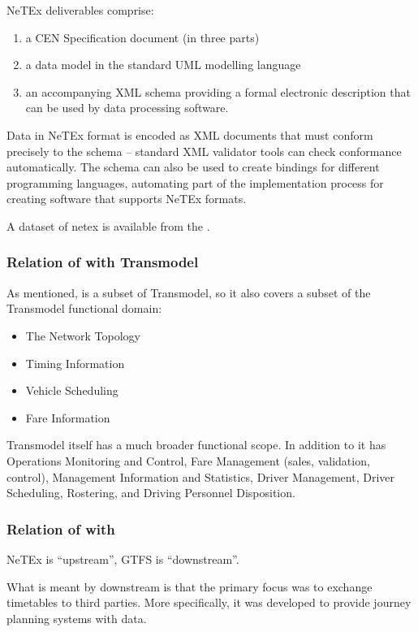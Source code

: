 NeTEx deliverables comprise: \begin{enumerate}
    \item a CEN Specification document (in three parts)
    \item a data model in the standard UML modelling language
    \item an accompanying XML schema providing a formal electronic description that can be used by data processing software.
\end{enumerate}

Data in NeTEx format is encoded as XML documents that must conform precisely to the schema – standard XML validator tools can check conformance automatically. The schema can also be used to create bindings for different
programming languages, automating part of the implementation process for creating software that supports NeTEx
formats. 

A dataset of netex is available from the  \cite{noauthor_use_nodate}. 

\subsubsection{Relation of  with Transmodel}
As mentioned,  is a subset of Transmodel, so it also covers a subset of the Transmodel functional domain:
\begin{itemize}
    \item The Network Topology
    \item Timing Information
    \item Vehicle Scheduling
    \item Fare Information
\end{itemize}
Transmodel itself has a much broader functional scope. In addition to  it has Operations Monitoring and Control, Fare Management (sales, validation, control), Management Information
and Statistics, Driver Management, Driver Scheduling, Rostering, and Driving Personnel Disposition.
\subsubsection{Relation of  with }

NeTEx is “upstream”, GTFS is “downstream”.

What is meant by downstream is that the primary focus  was to exchange timetables to third parties. More specifically, it was developed to provide journey planning systems with data. 


